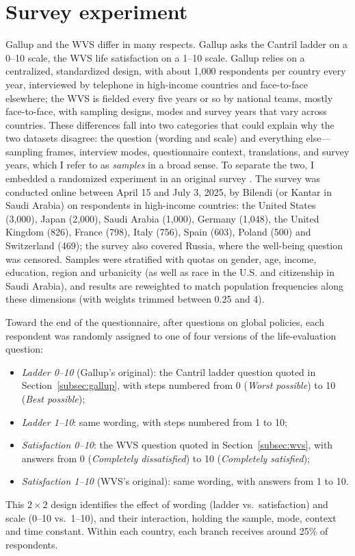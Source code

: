 \documentclass[11pt]{article}
\begin{document}
\section{Survey experiment}\label{subsec:fabre}
Gallup and the WVS differ in many respects. Gallup asks the Cantril ladder on a 0--10 scale, the WVS life satisfaction on a 1--10 scale. Gallup relies on a centralized, standardized design, with about 1,000 respondents per country every year, interviewed by telephone in high-income countries and face-to-face elsewhere; the WVS is fielded every five years or so by national teams, mostly face-to-face, with sampling designs, modes and survey years that vary across countries. These differences fall into two categories that could explain why the two datasets disagree: the question (wording and scale) and everything else---sampling frames, interview modes, questionnaire context, translations, and survey years, which I refer to as \textit{samples} in a broad sense. To separate the two, I embedded a randomized experiment in an original survey \citep{fabre_public_2025}. The survey was conducted online between April 15 and July 3, 2025, by Bilendi (or Kantar in Saudi Arabia) on \nFabre respondents in \nFabreCountries high-income countries: the United States (3,000), Japan (2,000), Saudi Arabia (1,000), Germany (1,048), the United Kingdom (826), France (798), Italy (756), Spain (603), Poland (500) and Switzerland (469); the survey also covered Russia, where the well-being question was censored. Samples were stratified with quotas on gender, age, income, education, region and urbanicity (as well as race in the U.S. and citizenship in Saudi Arabia), and results are reweighted to match population frequencies along these dimensions (with weights trimmed between 0.25 and 4).

Toward the end of the questionnaire, after questions on global policies, each respondent was randomly assigned to one of four versions of the life-evaluation question:
\begin{itemize}
    \item \textit{Ladder 0--10} (Gallup's original): the Cantril ladder question quoted in Section~\ref{subsec:gallup}, with steps numbered from 0 (\textit{Worst possible}) to 10 (\textit{Best possible});
    \item \textit{Ladder 1--10}: same wording, with steps numbered from 1 to 10;
    \item \textit{Satisfaction 0--10}: the WVS question quoted in Section~\ref{subsec:wvs}, with answers from 0 (\textit{Completely dissatisfied}) to 10 (\textit{Completely satisfied});
    \item \textit{Satisfaction 1--10} (WVS's original): same wording, with answers from 1 to 10.
\end{itemize}
This $2 \times 2$ design identifies the effect of wording (ladder vs.\ satisfaction) and scale (0--10 vs.\ 1--10), and their interaction, holding the sample, mode, context and time constant. Within each country, each branch receives around 25\% of respondents.
\end{document}
